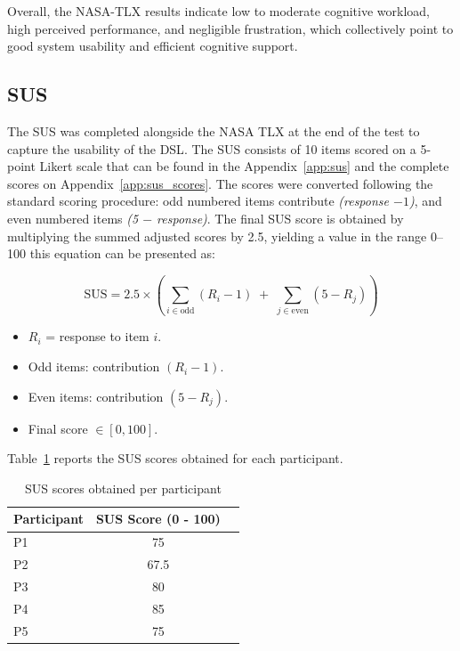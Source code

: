 Overall, the NASA-\gls{TLX} results indicate low to moderate cognitive workload, high perceived performance, and negligible frustration, which collectively point to good system usability and efficient cognitive support.


\subsection{\gls{SUS}}
\label{sec:test_usabl_sus}

The \gls{SUS} was completed alongside the NASA \gls{TLX} at the end of the test to capture the usability of the \gls{DSL}. The \gls{SUS} consists of 10 items scored on a 5-point Likert scale that can be found in the Appendix~\ref{app:sus} and the complete scores on Appendix~\ref{app:sus_scores}. The scores were converted following the standard scoring procedure: odd numbered items contribute \textit{(response $-1$)}, and even numbered items \textit{(5 $-$ response)}. The final \gls{SUS} score is obtained by multiplying the summed adjusted scores by 2.5, yielding a value in the range 0--100 this equation can be presented as:

\begin{equation}
	\text{SUS} = 2.5 \times 
	\left(
	\sum_{i \in \text{odd}} (R_i - 1)
	\;+\;
	\sum_{j \in \text{even}} (5 - R_j)
	\right)
\end{equation}

\begin{itemize}
	\item $R_i$ = response to item $i$.
	\item Odd items: contribution $(R_i - 1)$.
	\item Even items: contribution $(5 - R_j)$.
	\item Final score $\in [0, 100]$.
\end{itemize}  


Table~\ref{tab:sus_scores} reports the \gls{SUS} scores obtained for each participant.

\bgroup
{}
\begin{table}[htbp]
	\centering
	\caption{\gls{SUS} scores obtained per participant}
	\label{tab:sus_scores}
	\begin{tabular}{lcc}
		\toprule
		\rowcolor{Gainsboro}
		Participant & SUS Score (0 - 100) \\
		\midrule
		P1 & 75 \\
		P2 & 67.5 \\
		P3 & 80 \\
		P4 & 85 \\
		P5 & 75 \\
		\bottomrule
	\end{tabular}
\end{table}
\egroup

